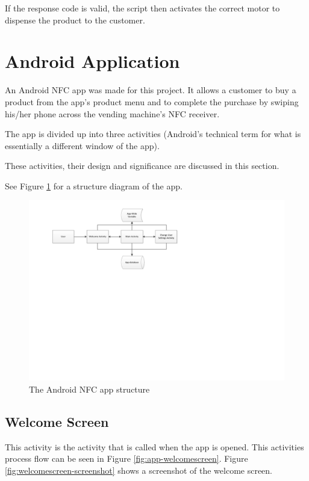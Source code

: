 If the response code is valid, the script then activates the correct motor to
dispense the product to the customer.

\section{Android Application}
\label{sec:nfc-android-app}

An Android NFC app was made for this project. It allows a customer to buy a
product from the app's product menu and to complete the purchase by swiping
his/her phone across the vending machine's NFC receiver.

The app is divided up into three activities (Android's technical term for what
is essentially a different window of the app). 

These activities, their design and significance are discussed in this section.

See Figure \ref{fig:nfc_app_structure} for a structure
diagram of the app.

\begin{figure}
 \centering 
 \includegraphics[clip = true, trim = 0 360 0 20,
 scale=0.7]{app_structure}
 \caption{The Android NFC app structure}
 \label{fig:nfc_app_structure}
\end{figure}

\subsection{Welcome Screen}

This activity is the activity that is called when the app is opened. This
activities process flow can be seen in Figure \ref{fig:app-welcomescreen}.
Figure \ref{fig:welcomescreen-screenshot} shows a screenshot of the welcome
screen.

